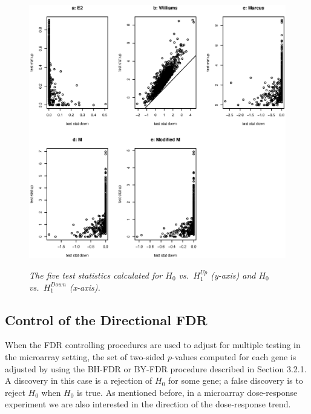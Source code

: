 \begin{figure}[!h]
\centering
{\includegraphics[width=.9\textwidth]{stat1a.eps}}
\caption{\em{The five test statistics calculated for $H_0$ vs.\
$H_1^{Up}$ (y-axis) and $H_0$ vs.\ $H_1^{Down}$ (x-axis).}}
\label{stat1}
\end{figure}








\subsection{Control of the Directional FDR}
\label{sec: FDR}

When the FDR controlling procedures are used to adjust for multiple
testing in the microarray setting, the set of two-sided $p$-values
computed for each gene is adjusted by using the BH-FDR or BY-FDR
procedure described in Section 3.2.1. A discovery in this case is a
rejection of $H_0$ for some gene; a false discovery is to reject
$H_0$ when $H_0$ is true. As mentioned before, in a microarray
dose-response experiment we are also interested in the direction of
the dose-response trend.

